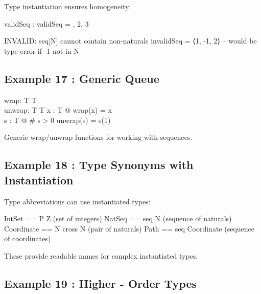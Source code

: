 \documentclass[a4paper,10pt,fleqn]{article}
\begin{document}
\noindent Type instantiation ensures homogeneity:

\bigskip

\begin{axdef}
validSeq : \seq \nat
\where
validSeq = , 2, 3 \rangle
\end{axdef}

\noindent INVALID: seq[N] cannot contain non-naturals invalidSeq = ⟨1, -1, 2⟩  -- would be type error if -1 not in N

\bigskip

\subsection*{Example 17 : Generic Queue}

\begin{gendef}[T]
  wrap: T \fun \seq T \\
  unwrap: \seq T \fun T
\where
  \forall x : T @ wrap(x) = \langle x \rangle \\
  \forall s : \seq T @ \# s > 0 \implies unwrap(s) = s(1)
\end{gendef}

\noindent Generic wrap/unwrap functions for working with sequences.

\bigskip

\subsection*{Example 18 : Type Synonyms with Instantiation}

\noindent Type abbreviations can use instantiated types:

\bigskip

\noindent IntSet == P Z (set of integers) NatSeq == seq N (sequence of naturals) Coordinate == N cross N (pair of naturals) Path == seq Coordinate (sequence of coordinates)

\bigskip

\noindent These provide readable names for complex instantiated types.

\bigskip

\subsection*{Example 19 : Higher - Order Types}
\end{document}
